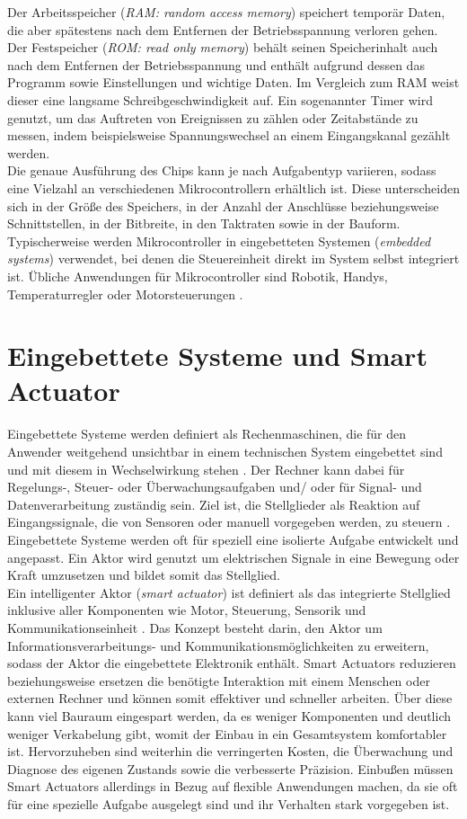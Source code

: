 Der Arbeitsspeicher (\textit{RAM: random access memory}) speichert temporär Daten, die aber spätestens nach dem Entfernen der Betriebsspannung verloren gehen.
Der Festspeicher (\textit{ROM: read only memory}) behält seinen Speicherinhalt auch nach dem Entfernen der Betriebsspannung und enthält aufgrund dessen das Programm sowie Einstellungen und wichtige Daten. Im Vergleich zum RAM weist dieser eine langsame Schreibgeschwindigkeit auf. 
Ein sogenannter Timer wird genutzt, um das Auftreten von Ereignissen zu zählen oder Zeitabstände zu messen, indem beispielsweise Spannungswechsel an einem Eingangskanal gezählt werden. \\
Die genaue Ausführung des Chips kann je nach Aufgabentyp variieren, sodass eine Vielzahl an verschiedenen Mikrocontrollern erhältlich ist. Diese unterscheiden sich in der Größe des Speichers, in der Anzahl der Anschlüsse beziehungsweise Schnittstellen, in der Bitbreite, in den Taktraten sowie in der Bauform. Typischerweise werden Mikrocontroller in eingebetteten Systemen (\textit{embedded systems}) verwendet, bei denen die Steuereinheit direkt im System selbst integriert ist. Übliche Anwendungen für Mikrocontroller sind Robotik, Handys, Temperaturregler oder Motorsteuerungen \cite{Brinkschulte}. 

\section{Eingebettete Systeme und Smart Actuator}
Eingebettete Systeme werden definiert als Rechenmaschinen, die für den Anwender weitgehend unsichtbar in einem technischen System eingebettet sind und mit diesem in Wechselwirkung stehen \cite[S.8]{Gessler2014}. Der Rechner kann dabei für Regelungs-, Steuer- oder Überwachungsaufgaben und/ oder für Signal- und Datenverarbeitung zuständig sein. Ziel ist, die Stellglieder als Reaktion auf Eingangssignale, die von Sensoren oder manuell vorgegeben werden, zu steuern \cite[S.1]{Broy2003}. Eingebettete Systeme werden oft für speziell eine isolierte Aufgabe entwickelt und angepasst.
Ein Aktor wird genutzt um elektrischen Signale in eine Bewegung oder Kraft umzusetzen und bildet somit das Stellglied. \\
Ein intelligenter Aktor (\textit{smart actuator}) ist definiert als das integrierte Stellglied inklusive aller Komponenten wie Motor, Steuerung, Sensorik und Kommunikationseinheit \cite[S.442]{smartactuator}.
Das Konzept besteht darin, den Aktor um Informationsverarbeitungs- und Kommunikationsmöglichkeiten zu erweitern, sodass der Aktor die eingebettete Elektronik enthält.
Smart Actuators reduzieren beziehungsweise ersetzen die benötigte Interaktion mit einem Menschen oder externen Rechner und können somit effektiver und schneller arbeiten. Über diese kann viel Bauraum eingespart werden, da es weniger Komponenten und deutlich weniger Verkabelung gibt, womit der Einbau in ein Gesamtsystem komfortabler ist. Hervorzuheben sind weiterhin die verringerten Kosten, die Überwachung und Diagnose des eigenen Zustands sowie die verbesserte Präzision. Einbußen müssen Smart Actuators allerdings in Bezug auf flexible Anwendungen machen, da sie oft für eine spezielle Aufgabe ausgelegt sind und ihr Verhalten stark vorgegeben ist. \cite[S.4]{smartaktor}

